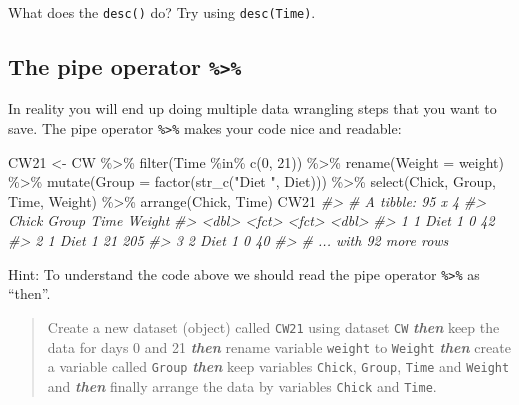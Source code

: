 \documentclass[
  14pt,
]{memoir}
\newenvironment{Shaded}{\begin{snugshade}}{\end{snugshade}}
\newcommand{\AttributeTok}[1]{\textcolor[rgb]{0.77,0.63,0.00}{#1}}
\newcommand{\CommentTok}[1]{\textcolor[rgb]{0.56,0.35,0.01}{\textit{#1}}}
\newcommand{\DecValTok}[1]{\textcolor[rgb]{0.00,0.00,0.81}{#1}}
\newcommand{\FunctionTok}[1]{\textcolor[rgb]{0.00,0.00,0.00}{#1}}
\newcommand{\NormalTok}[1]{#1}
\newcommand{\OtherTok}[1]{\textcolor[rgb]{0.56,0.35,0.01}{#1}}
\newcommand{\SpecialCharTok}[1]{\textcolor[rgb]{0.00,0.00,0.00}{#1}}
\newcommand{\StringTok}[1]{\textcolor[rgb]{0.31,0.60,0.02}{#1}}
\begin{document}
What does the \texttt{desc()} do? Try using \texttt{desc(Time)}.

\hypertarget{the-pipe-operator}{%
\subsection{\texorpdfstring{The pipe operator \texttt{\%\textgreater{}\%}}{The pipe operator \%\textgreater\%}}\label{the-pipe-operator}}

In reality you will end up doing multiple data wrangling steps that you want to save.
The pipe operator \texttt{\%\textgreater{}\%} makes your code nice and readable:

\begin{Shaded}
\begin{Highlighting}[]
\NormalTok{CW21 }\OtherTok{\textless{}{-}}\NormalTok{ CW }\SpecialCharTok{\%\textgreater{}\%} 
  \FunctionTok{filter}\NormalTok{(Time }\SpecialCharTok{\%in\%} \FunctionTok{c}\NormalTok{(}\DecValTok{0}\NormalTok{, }\DecValTok{21}\NormalTok{)) }\SpecialCharTok{\%\textgreater{}\%} 
  \FunctionTok{rename}\NormalTok{(}\AttributeTok{Weight =}\NormalTok{ weight) }\SpecialCharTok{\%\textgreater{}\%} 
  \FunctionTok{mutate}\NormalTok{(}\AttributeTok{Group =} \FunctionTok{factor}\NormalTok{(}\FunctionTok{str\_c}\NormalTok{(}\StringTok{"Diet "}\NormalTok{, Diet))) }\SpecialCharTok{\%\textgreater{}\%} 
  \FunctionTok{select}\NormalTok{(Chick, Group, Time, Weight) }\SpecialCharTok{\%\textgreater{}\%} 
  \FunctionTok{arrange}\NormalTok{(Chick, Time) }
\NormalTok{CW21}
\CommentTok{\#\textgreater{} \# A tibble: 95 x 4}
\CommentTok{\#\textgreater{}   Chick Group  Time  Weight}
\CommentTok{\#\textgreater{}   \textless{}dbl\textgreater{} \textless{}fct\textgreater{}  \textless{}fct\textgreater{}  \textless{}dbl\textgreater{}}
\CommentTok{\#\textgreater{} 1     1 Diet 1 0         42}
\CommentTok{\#\textgreater{} 2     1 Diet 1 21       205}
\CommentTok{\#\textgreater{} 3     2 Diet 1 0         40}
\CommentTok{\#\textgreater{} \# ... with 92 more rows}
\end{Highlighting}
\end{Shaded}

Hint: To understand the code above we should read the pipe operator \texttt{\%\textgreater{}\%} as ``then''.

\begin{quote}
Create a new dataset (object) called \texttt{CW21} using dataset \texttt{CW} \textbf{\emph{then}}
keep the data for days 0 and 21 \textbf{\emph{then}} rename variable \texttt{weight} to \texttt{Weight}
\textbf{\emph{then}} create a variable called \texttt{Group} \textbf{\emph{then}} keep variables \texttt{Chick},
\texttt{Group}, \texttt{Time} and \texttt{Weight} and \textbf{\emph{then}} finally arrange the data by
variables \texttt{Chick} and \texttt{Time}.
\end{quote}
\end{document}
